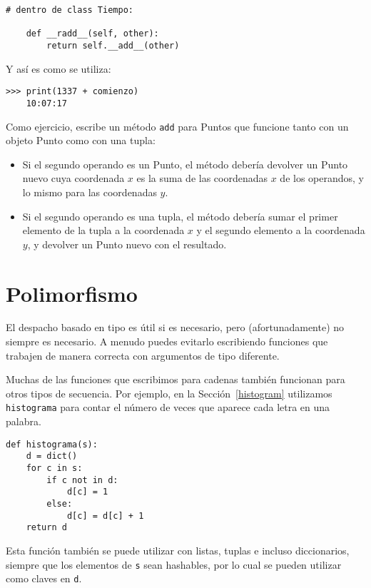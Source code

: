 \documentclass[10pt]{book}
\begin{document}
\begin{verbatim}
# dentro de class Tiempo:

    def __radd__(self, other):
        return self.__add__(other)
\end{verbatim}
%
Y así es como se utiliza:

\begin{verbatim}
>>> print(1337 + comienzo)
    10:07:17
\end{verbatim}
%

Como ejercicio, escribe un método {\tt add} para Puntos que funcione tanto con
un objeto Punto como con una tupla:

\begin{itemize}

\item Si el segundo operando es un Punto, el método debería devolver un
Punto nuevo cuya coordenada $x$ es la suma de las coordenadas $x$ de los
operandos, y lo mismo para las coordenadas $y$.

\item Si el segundo operando es una tupla, el método debería sumar el
primer elemento de la tupla a la coordenada $x$ y el segundo
elemento a la coordenada $y$, y devolver un Punto nuevo con el resultado.

\end{itemize}




\section{Polimorfismo}
\label{polymorphism}

El despacho basado en tipo es útil si es necesario, pero (afortunadamente)
no siempre es necesario.  A menudo puedes evitarlo escribiendo funciones
que trabajen de manera correcta con argumentos de tipo diferente.

Muchas de las funciones que escribimos para cadenas también
funcionan para otros tipos de secuencia.
Por ejemplo, en la Sección~\ref{histogram}
utilizamos {\tt histograma} para contar el número de veces que aparece cada letra
en una palabra.

\begin{verbatim}
def histograma(s):
    d = dict()
    for c in s:
        if c not in d:
            d[c] = 1
        else:
            d[c] = d[c] + 1
    return d
\end{verbatim}
%
Esta función también se puede utilizar con listas, tuplas e incluso diccionarios,
siempre que los elementos de {\tt s} sean hashables, por lo cual se pueden utilizar
como claves en {\tt d}.
\end{document}
